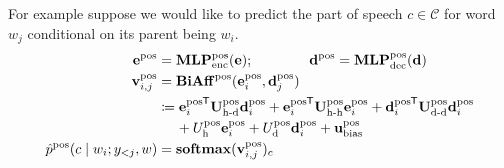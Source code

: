 \documentclass{report}
\theoremstyle{definition}
\theoremstyle{plain}
\theoremstyle{definition}
\theoremstyle{remark}
\numberwithin{equation}{section}
\numberwithin{figure}{section}
\numberwithin{table}{section}
\newcommand*{\tran}{^{\mkern-1.5mu\mathsf{T}}}
\begin{document}
For example suppose we would like to predict the part of speech \(c \in \mathcal{C}\) for word \(w_{j}\) conditional on its parent being \(w_{i}\).
\begin{align}
    \vb{e}^{\mathrm{pos}} &= \mathbf{MLP}_{\mathrm{enc}}^{\mathrm{pos}}(\vb{e}); \qquad \qquad \vb{d}^{\mathrm{pos}} = \mathbf{MLP}_{\mathrm{dec}}^{\mathrm{pos}}(\vb{d}) \\
    \vb{v}^{\mathrm{pos}}_{i,j} &= \mathbf{BiAff}^{\mathrm{pos}}(\vb{e}^{\mathrm{pos}}_{i}, \vb{d}^{\mathrm{pos}}_{j}) \\
    &\coloneqq {\vb{e}^{\mathrm{pos}}_{i}}\tran \mathbf{U}_{\text{h-d}}^{\mathrm{pos}} \vb{d}_{i}^{\mathrm{pos}}  + 
            {\vb{e}_{i}^{\mathrm{pos}}}\tran \mathbf{U}_{\text{h-h}}^{\mathrm{pos}} \vb{e}_{i}^{\mathrm{pos}}
            + {\vb{d}_{i}^{\mathrm{pos}}}\tran \mathbf{U}_{\text{d-d}}^{\mathrm{pos}} \vb{d}_{i}^{\mathrm{pos}}
         \\
        &\phantom{\coloneqq}\  + U_{\text{h}}^{\mathrm{pos}} \vb{e}_{i}^{\mathrm{pos}}
        + U_{\text{d}}^{\mathrm{pos}} \vb{d}_{i}^{\mathrm{pos}}
        + \vb{u}_{\text{bias}}^{\mathrm{pos}} \\
        \hat{p}^{\mathrm{pos}}(c \mid w_{i}; y_{<j}, w) &= \mathbf{softmax}(\vb{v}^{\mathrm{pos}}_{i,j})_{c}
\end{align}
\end{document}
